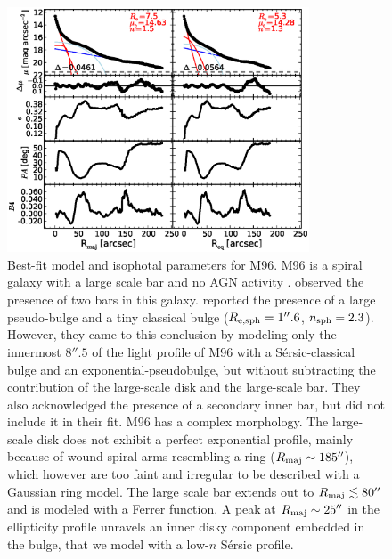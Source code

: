 \documentclass[preprint2]{emulateapj}
\newcommand{\fitfigurewidth}{0.8\textwidth}
\begin{document}
  \begin{figure}[h]
  \begin{center}
  \includegraphics[width=\fitfigurewidth]{images/m96_1Dfit.eps}
  \caption{Best-fit model and isophotal parameters for M96.
  M96 is a spiral galaxy with a large scale bar and no AGN activity \citep{martini2003,nowak2010n3368n3489}. 
  \cite{erwin2004} observed the presence of two bars in this galaxy. 
  \cite{nowak2010n3368n3489} reported the presence of a large pseudo-bulge and a tiny classical bulge 
  ($R_{\rm e, sph} = 1''.6$, $n_{\rm sph} = 2.3$). 
  However, they came to this conclusion by modeling only the innermost $8''.5$ of the 
  light profile of M96 with a S\'ersic-classical bulge and an exponential-pseudobulge, 
  but without subtracting the contribution of the large-scale disk and the large-scale bar.
  They also acknowledged the presence of a secondary inner bar, but did not include it in their fit. 
  M96 has a complex morphology. 
  The large-scale disk does not exhibit a perfect exponential profile, 
  mainly because of wound spiral arms resembling a ring ($R_{\rm maj} \sim 185''$),
  which however are too faint and irregular to be described with a Gaussian ring model. 
  The large scale bar extends out to $R_{\rm maj} \lesssim 80''$ and is modeled with a Ferrer function.
  A peak at $R_{\rm maj} \sim 25''$ in the ellipticity profile unravels an inner disky component embedded in the bulge, 
  that we model with a low-$n$ S\'ersic profile.
  }
  \end{center}
  \end{figure}
\end{document}

